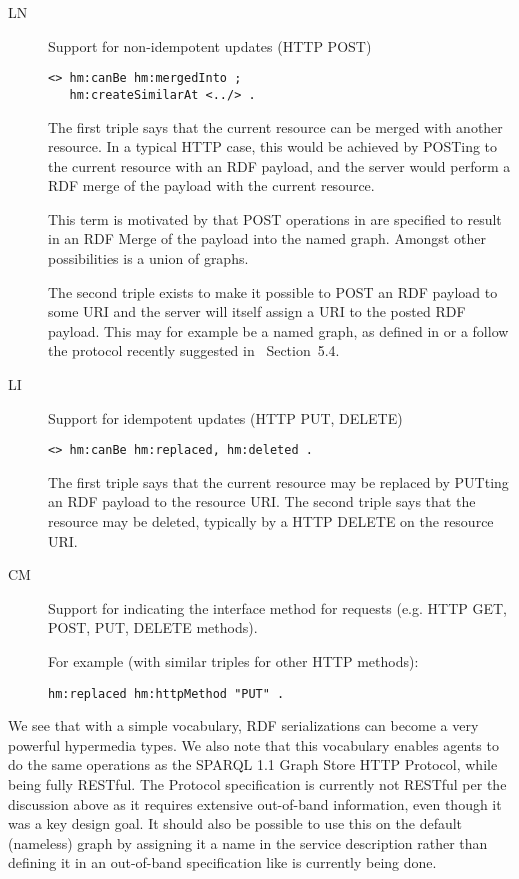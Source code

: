 \documentclass{llncs}
\begin{document}
\begin{description}

\item[\textsf{LN}] Support for non-idempotent updates (HTTP POST) 

\begin{verbatim}
<> hm:canBe hm:mergedInto ;
   hm:createSimilarAt <../> .
\end{verbatim}

The first triple says that the current resource can be merged with
another resource. In a typical HTTP case, this would be achieved by
POSTing to the current resource with an RDF payload, and the server
would perform a RDF merge of the payload with the current resource.

This term is motivated by that POST operations in \cite{graphstore} are
specified to result in an RDF Merge of the payload into the named
graph. Amongst other possibilities is a union of graphs.

The second triple exists to make it possible to POST an RDF payload to
some URI and the server will itself assign a URI to the posted RDF
payload. This may for example be a named graph, as defined in
\cite{graphstore} or a follow the protocol recently suggested in
\cite{linkeddatabasicprofilesubmission}~Section~5.4.

\item[\textsf{LI}] Support for idempotent updates (HTTP PUT, DELETE) 

\begin{verbatim}
<> hm:canBe hm:replaced, hm:deleted .
\end{verbatim}


The first triple says that the current resource may be replaced by
PUTting an RDF payload to the resource URI. The second triple says
that the resource may be deleted, typically by a HTTP DELETE on the
resource URI.


\item[\textsf{CM}] Support for indicating the interface method for requests
  (e.g. HTTP GET, POST, PUT, DELETE methods).

For example (with similar triples for other HTTP methods):
\begin{verbatim}
hm:replaced hm:httpMethod "PUT" .
\end{verbatim}

\end{description}

We see that with a simple vocabulary, RDF serializations can become a
very powerful hypermedia types. We also note that this vocabulary
enables agents to do the same operations as the SPARQL 1.1 Graph Store
HTTP Protocol\cite{graphstore}, while being fully RESTful. The
Protocol specification is currently not RESTful per the discussion
above as it requires extensive out-of-band information, even though it
was a key design goal. It should also be possible to use this on the
default (nameless) graph by assigning it a name in the service
description rather than defining it in an out-of-band specification
like is currently being done.
\end{document}
